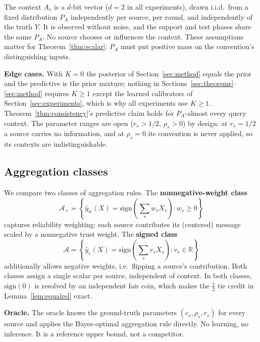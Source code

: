 The context $A_s$ is a $d$-bit vector ($d=2$ in all experiments), drawn
i.i.d.\ from a fixed distribution $P_A$ independently per source, per
round, and independently of the truth $Y$. It is observed without noise,
and the support and test phases share the same $P_A$. No
source chooses or influences the context. These assumptions matter for
Theorem~\ref{thm:scalar}: $P_A$ must put positive mass on the convention's
distinguishing inputs.

\textbf{Edge cases.} With $K = 0$ the posterior of
Section~\ref{sec:method} equals the prior and the predictive is the prior
mixture; nothing in Sections~\ref{sec:theorems}--\ref{sec:method}
requires $K \geq 1$ except the learned calibrators of
Section~\ref{sec:experiments}, which is why all experiments use
$K \geq 1$. Theorem~\ref{thm:consistency}'s predictive claim holds for
$P_A$-almost every query context. The parameter ranges are open
($r_s > 1/2$, $\rho_s > 0$) by design: at $r_s = 1/2$ a source carries no
information, and at $\rho_s = 0$ its convention is never applied, so its
contexts are indistinguishable.

\subsection{Aggregation classes}

We compare two classes of aggregation rules. The \textbf{nonnegative-weight
class}
\begin{equation}
\mathcal{A}_+ = \left\{ \hat{y}_w(X)
= \mathrm{sign}\!\left(\sum_s w_s X_s\right) : w_s \geq 0 \right\}
\end{equation}
captures reliability weighting: each source contributes its (centered)
message scaled by a nonnegative trust weight. The \textbf{signed class}
\begin{equation}
\mathcal{A} = \left\{ \hat{y}_v(X)
= \mathrm{sign}\!\left(\sum_s v_s X_s\right) : v_s \in \mathbb{R} \right\}
\end{equation}
additionally allows negative weights, i.e.\ flipping a source's
contribution. Both classes assign a single scalar per source, independent
of context. In both classes, $\mathrm{sign}(0)$ is resolved by an
independent fair coin, which makes the $\tfrac12$ tie credit in
Lemma~\ref{lem:equalrel} exact.

\textbf{Oracle.} The oracle knows the ground-truth parameters
$(c_s, \rho_s, r_s)$ for every source and applies the Bayes-optimal
aggregation rule directly. No learning, no inference. It is a reference
upper bound, not a competitor.
